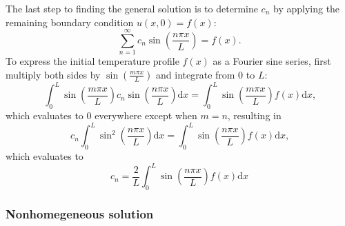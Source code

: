 \documentclass{article}
\begin{document}
The last step to finding the general solution is to determine $c_n$ by applying the remaining boundary condition $u(x,0) = f(x)$:
\begin{equation}
\sum_{n=1}^{\infty} c_n \sin\left(\frac{n \pi x}{L}\right) = f(x)\text{.}
\end{equation}
To express the initial temperature profile $f(x)$ as a Fourier sine series, first multiply both sides by $\sin\left(\frac{m \pi x}{L}\right)$ and integrate from $0$ to $L$:
\begin{equation}
\int_0^L \sin\left(\frac{m \pi x}{L}\right)c_n\sin\left(\frac{n \pi x}{L}\right) \mathrm{d}x =
\int_0^L \sin\left(\frac{m \pi x}{L}\right)f(x) \mathrm{d}x\text{,}
\end{equation}
which evaluates to $0$ everywhere except when $m = n$, resulting in
\begin{equation}
c_n \int_0^L \sin^2\left(\frac{n \pi x}{L}\right) \mathrm{d}x = \int_0^L \sin\left(\frac{n \pi x}{L}\right)f(x) \mathrm{d}x\text{,}
\end{equation}
which evaluates to
\begin{equation}
\boxed{c_n = \frac{2}{L}\int_0^L \sin\left(\frac{n \pi x}{L}\right)f(x)\mathrm{d}x}
\end{equation}

\subsubsection{Nonhomegeneous solution}
\end{document}
